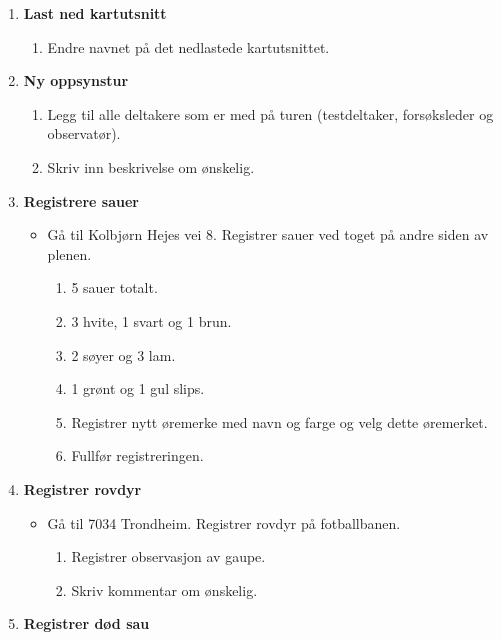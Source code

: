 \renewcommand{\labelenumii}{\theenumii}
\renewcommand{\theenumii}{\theenumi.\arabic{enumii}.}
\begin{enumerate}[font=\bfseries]
    \item \textbf{Last ned kartutsnitt}
    \begin{enumerate}
        \item Endre navnet på det nedlastede kartutsnittet. 
    \end{enumerate}
    \item \textbf{Ny oppsynstur}
    \begin{enumerate}
        \item Legg til alle deltakere som er med på turen (testdeltaker, forsøksleder og observatør).
        \item Skriv inn beskrivelse om ønskelig.
    \end{enumerate}
    \item \textbf{Registrere sauer}
    \begin{itemize}
        \item Gå til Kolbjørn Hejes vei 8. Registrer sauer ved toget på andre siden av plenen.
        \begin{enumerate}
            \item 5 sauer totalt.
            \item 3 hvite, 1 svart og 1 brun.
            \item 2 søyer og 3 lam.
            \item 1 grønt og 1 gul slips.
            \item Registrer nytt øremerke med navn og farge og velg dette øremerket.
            \item Fullfør registreringen.
        \end{enumerate}
    \end{itemize}
    \item \textbf{Registrer rovdyr}
    \begin{itemize}
        \item Gå til 7034 Trondheim. Registrer rovdyr på fotballbanen.
        \begin{enumerate}
            \item Registrer observasjon av gaupe.
            \item Skriv kommentar om ønskelig.
        \end{enumerate}   
    \end{itemize}
    \item \textbf{Registrer død sau}
    \begin{itemize}

\end{itemize}
\end{enumerate}
